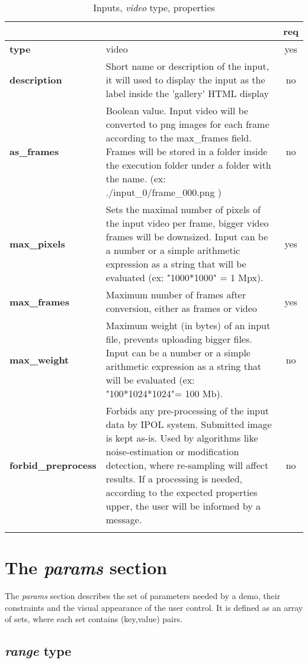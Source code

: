 \begin{longtable}{|>{\bf}L{\linewidth}|L{\linewidth}|c|}
\hline
{}     &  & {\bf req} \tabularnewline 
\hline \hline
 type         & video & yes \\ \hline
 description  & Short name or description of the input, it will used to display 
the input as the label inside the 'gallery' HTML display & no \\ \hline
 as\_frames & Boolean value. Input video will be converted to png images for each frame according to the max\_frames field. Frames
 will be stored in a folder inside the execution folder under a folder with the name. (ex: ./input\_0/frame\_000.png ) & no \\ \hline
 max\_pixels   &  Sets the maximal number of pixels of the input video per frame, 
bigger video frames will be downsized. 
Input can be a number or a simple arithmetic expression as a string that will be evaluated (ex: "1000*1000" = 1 Mpx).  & yes \\ \hline 
 max\_frames  &  Maximum number of frames after conversion, either as frames or video & yes \\ \hline
 max\_weight   & Maximum weight (in bytes) of an input file, prevents uploading bigger files.
Input can be a number or a simple arithmetic expression as a string that will be evaluated (ex: "100*1024*1024"= 100 Mb). & no \\ \hline
forbid\_preprocess         & Forbids any pre-processing of the input data by IPOL system. 
Submitted image is kept as-is.
Used by algorithms like noise-estimation or modification detection, where re-sampling will affect results. 
If a processing is needed, according to the expected properties upper, the user will be informed by a message.
& no \\ \hline
\caption{Inputs, \emph{video} type, properties}
\end{longtable}

\section{The \emph{params} section}
The \emph{params} section describes the set of parameters needed by a demo, their 
constraints and the visual appearance of the user control. It is defined as an array of sets, 
where each set contains (key,value) pairs.


\subsection{ \emph{range} type}

